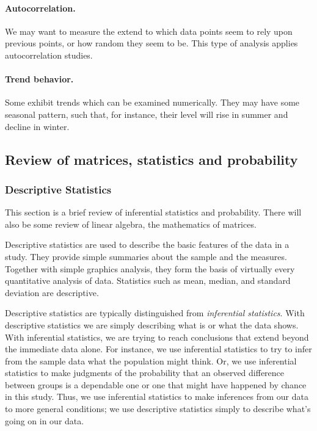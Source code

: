\paragraph{Autocorrelation.} We may want to measure the extend to which data points seem to rely upon previous points, or how random they seem to be. This type of analysis applies autocorrelation studies.

\paragraph{Trend behavior.} Some \fts{} exhibit trends which can be examined numerically. They may have some seasonal pattern, such that, for instance, their level will rise in summer and decline in winter.

\subsection{Review of matrices, statistics and probability }
\subsubsection{Descriptive Statistics}
This section is a brief review of inferential statistics and probability.  There will also be some review of linear algebra, the mathematics of matrices.

\marginpar{\begin{small}\begin{flushleft}\textcolor{red}{A working knowledge of statistics and matrix math is assumed.}\end{flushleft}\end{small}}
Descriptive statistics are used to describe the basic features of the data in a study. They provide simple summaries about the sample and the measures. Together with simple graphics analysis, they form the basis of virtually every quantitative analysis of data. Statistics such as mean, median, and standard deviation are descriptive.

Descriptive statistics are typically distinguished from \emph{inferential statistics}. With descriptive statistics we are simply describing what is or what the data shows. With inferential statistics, we are trying to reach conclusions that extend beyond the immediate data alone. For instance, we use inferential statistics to try to infer from the sample data what the population might think. Or, we use inferential statistics to make judgments of the probability that an observed difference between groups is a dependable one or one that might have happened by chance in this study. Thus, we use inferential statistics to make inferences from our data to more general conditions; we use descriptive statistics simply to describe what's going on in our data.

